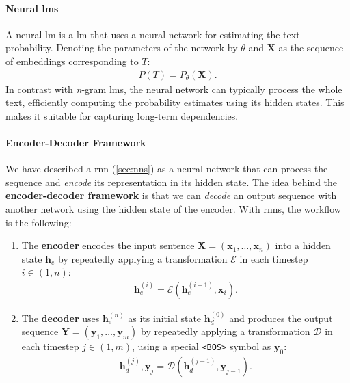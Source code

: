 \paragraph{Neural \acp{lm}} A neural \ac{lm} is a \acl{lm} that uses a neural network for estimating the text probability. Denoting the parameters of the network by $\theta$ and $\mathbf{X}$ as the sequence of embeddings corresponding to $T$:
\begin{align}
    P(T) = P_\theta(\mathbf{X}).
\end{align}
In contrast with \emph{n}-gram \acp{lm}, the neural network can typically process the whole text, efficiently computing the probability estimates using its hidden states. This makes it suitable for capturing long-term dependencies.


\paragraph{Encoder-Decoder Framework}
We have described a \ac{rnn} (\autoref{sec:nns}) as a neural network that can process the sequence and \emph{encode} its representation in its hidden state.
The idea behind the \textbf{encoder-decoder framework} \cite{sutskever2014sequence,cho2014learning} is that we can \emph{decode} an output sequence with another network using the hidden state of the encoder. With \acp{rnn}, the workflow is the following:

\begin{enumerate}
    \item The \textbf{encoder} encodes the input sentence $\mathbf{X}= (\mathbf{x}_1, \ldots, \mathbf{x}_n)$ into a hidden state $\mathbf{h}_e$ by repeatedly applying a transformation $\mathcal{E}$ in each timestep $i\in(1,n)$:
          \begin{align}
              \mathbf{h}_e^{(i)} = \mathcal{E}(\mathbf{h}_e^{(i-1)}, \mathbf{x}_i).
          \end{align}
    \item The \textbf{decoder} uses $\mathbf{h}_e^{(n)}$ as its initial state $\mathbf{h}_d^{(0)}$ and produces the output sequence  $\mathbf{Y} = (\mathbf{y}_1, \ldots, \mathbf{y}_m)$ by repeatedly applying a transformation $\mathcal{D}$ in each timestep $j\in(1,m)$, using a special \texttt{<BOS>} symbol as $\mathbf{y}_0$:
          \begin{align}
              \mathbf{h}_d^{(j)}, \mathbf{y}_j = \mathcal{D}(\mathbf{h}_d^{(j-1)}, \mathbf{y}_{j-1}).
          \end{align}
\end{enumerate}

